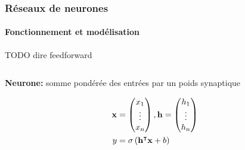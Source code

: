 \documentclass[10pt]{beamer}
\newcommand*\colvec[3][]{
    \begin{pmatrix}\ifx\relax#1\relax\else#1\\\fi#2\\#3\end{pmatrix}
}
\begin{document}
\begin{frame}
\frametitle{Réseaux de neurones}
\framesubtitle{Fonctionnement et modélisation}   


TODO dire feedforward

\begin{columns}[T]
\begin{column}{0.70\textwidth}
\footnotesize
\textbf{Neurone:} somme pondérée des entrées par un poids synaptique

\begin{align*}
  \mathbf{x} & = \colvec[x_1]{\vdots}{x_n}, \mathbf{h} = \colvec[h_1]{\vdots}{h_n} \\
             y & = \sigma\left(\mathbf{h}^\intercal \mathbf{x} + b\right)  \\
\end{align*}


\end{column}
\end{columns}
\end{frame}
\end{document}
